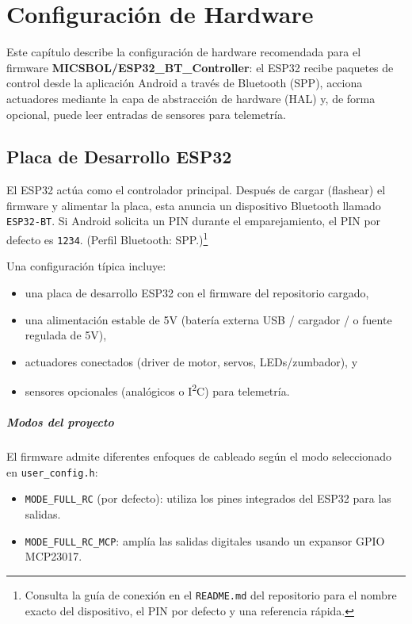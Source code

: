 \chapter{Configuración de Hardware}
\label{ch:hardware-setup}

Este capítulo describe la configuración de hardware recomendada para el firmware
\textbf{MICSBOL/ESP32\_BT\_Controller}: el ESP32 recibe paquetes de control desde la aplicación Android a través de
Bluetooth (SPP), acciona actuadores mediante la capa de abstracción de hardware (HAL) y, de forma opcional,
puede leer entradas de sensores para telemetría.

\section{Placa de Desarrollo ESP32}
\label{sec:hw-esp32-board}

El ESP32 actúa como el controlador principal. Después de cargar (flashear) el firmware y alimentar la placa,
esta anuncia un dispositivo Bluetooth llamado \texttt{ESP32-BT}. Si Android solicita un PIN durante el emparejamiento,
el PIN por defecto es \texttt{1234}. (Perfil Bluetooth: SPP.)\footnote{Consulta la guía de conexión en el
    \texttt{README.md} del repositorio para el nombre exacto del dispositivo, el PIN por defecto y una referencia rápida.}

Una configuración típica incluye:
\begin{itemize}
    \item una placa de desarrollo ESP32 con el firmware del repositorio cargado,
    \item una alimentación estable de 5V (batería externa USB / cargador / o fuente regulada de 5V),
    \item actuadores conectados (driver de motor, servos, LEDs/zumbador), y
    \item sensores opcionales (analógicos o I\textsuperscript{2}C) para telemetría.
\end{itemize}

\paragraph{Modos del proyecto}
El firmware admite diferentes enfoques de cableado según el modo seleccionado en \texttt{user\_config.h}:
\begin{itemize}
    \item \texttt{MODE\_FULL\_RC} (por defecto): utiliza los pines integrados del ESP32 para las salidas.
    \item \texttt{MODE\_FULL\_RC\_MCP}: amplía las salidas digitales usando un expansor GPIO MCP23017.
\end{itemize}

